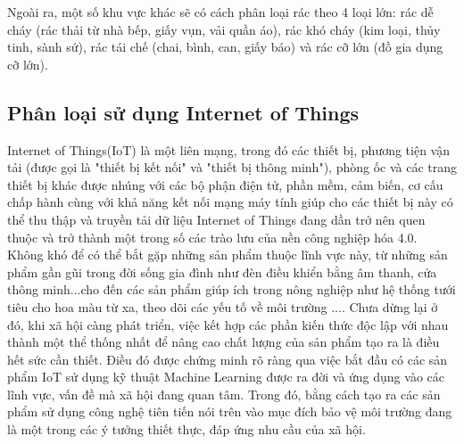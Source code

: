 Ngoài ra, một số khu vực khác sẽ có cách phân loại rác theo 4 loại lớn: rác dễ cháy (rác thải từ nhà bếp, giấy vụn, vải quần áo), rác khó cháy (kim loại, thủy tinh, sành sứ), rác tái chế (chai, bình, can, giấy báo) và rác cỡ lớn (đồ gia dụng cỡ lớn).

\subsection{Phân loại sử dụng Internet of Things}
Internet of Things(IoT) là một liên mạng, trong đó các thiết bị, phương tiện vận tải (được gọi là "thiết bị kết nối" và "thiết bị thông minh"), phòng ốc và các trang thiết bị khác được nhúng với các bộ phận điện tử, phần mềm, cảm biến, cơ cấu chấp hành cùng với khả năng kết nối mạng máy tính giúp cho các thiết bị này có thể thu thập và truyền tải dữ liệu
Internet of Things đang dần trở nên quen thuộc và trở thành một trong số các trào lưu của nền công nghiệp hóa 4.0.
Không khó để có thể bắt gặp những sản phẩm thuộc lĩnh vực này, từ những sản phẩm gần gũi trong đời sống gia đình như đèn điều khiển bằng âm thanh, cửa thông minh...cho đến các sản phẩm giúp ích trong nông nghiệp như hệ thống tưới tiêu cho hoa màu từ xa, theo dõi các yếu tố về môi trường .... 
Chưa dừng lại ở đó, khi xã hội càng phát triển, việc kết hợp các phần kiến thức độc lập với nhau thành một thể thống nhất để nâng cao chất lượng của sản phẩm tạo ra là điều hết sức cần thiết.
Điều đó được chứng minh rõ ràng qua việc bắt đầu có các sản phẩm IoT sử dụng kỹ thuật Machine Learning được ra đời và ứng dụng vào các lĩnh vực, vấn đề mà xã hội đang quan tâm.
Trong đó, bằng cách tạo ra các sản phẩm sử dụng công nghệ tiên tiến nói trên vào mục đích bảo vệ môi trường đang là một trong các ý tưởng thiết thực, đáp ứng nhu cầu của xã hội.

